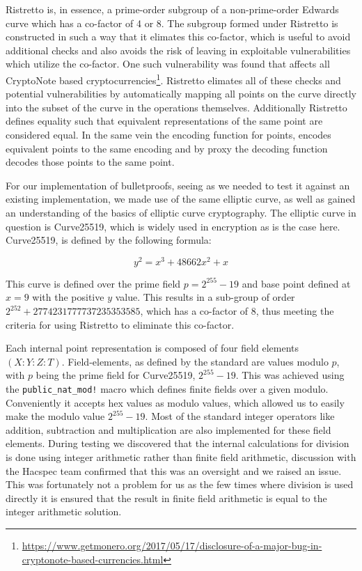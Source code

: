 \documentclass{article}
\begin{document}
Ristretto is, in essence, a prime-order subgroup of a non-prime-order
Edwards curve which has a co-factor of 4 or 8. The subgroup formed under
Ristretto is constructed in such a way that it elimates this co-factor,
which is useful to avoid additional checks and also avoids the risk of
leaving in exploitable vulnerabilities which utilize the co-factor. One
such vulnerability was found that affects all CryptoNote based
cryptocurrencies\footnote{\url{https://www.getmonero.org/2017/05/17/disclosure-of-a-major-bug-in-cryptonote-based-currencies.html}}.
Ristretto elimates all of these checks and potential vulnerabilities
by automatically mapping all points on the curve directly into the
subset of the curve in the operations themselves. Additionally Ristretto
defines equality such that equivalent representations of the same point
are considered equal. In the same vein the encoding function for points,
encodes equivalent points to the same encoding and by proxy the decoding
function decodes those points to the same point.

For our implementation of bulletproofs, seeing as we needed to test it
against an existing implementation, we made use of the same elliptic
curve, as well as gained an understanding of the basics of elliptic
curve cryptography. The elliptic curve in question is Curve25519, which
is widely used in encryption as is the case here. Curve25519, is defined by the following formula:

$$y^2 = x^3 + 48662x^2 + x$$

This curve is defined over the prime field $p = 2^{255} - 19$ and base
point defined at $x = 9$ with the positive $y$ value. This results in a
sub-group of order $2^{252} + 2774231777737235353585$, which has a
co-factor of $8$, thus meeting the criteria for using Ristretto to eliminate this co-factor.

Each internal point representation is composed of four field elements
$(X : Y : Z : T)$. Field-elements, as defined by the standard are
values modulo $p$, with $p$ being the prime field for Curve25519,
$2^{255} - 19$. This was achieved using the \texttt{public\_nat\_mod!}
macro which defines finite fields over a given modulo. Conveniently it
accepts hex values as modulo values, which allowed us to easily make
the modulo value $2^{255} - 19$. Most of the standard integer operators
like addition, subtraction and multiplication are also implemented for
these field elements. During testing we discovered that the internal
calculations for division is done using integer arithmetic rather than
finite field arithmetic, discussion with the Hacspec team confirmed
that this was an oversight and we raised an issue. This was fortunately
not a problem for us as the few times where division is used directly
it is ensured that the result in finite field arithmetic is equal to
the integer arithmetic solution.
\end{document}
